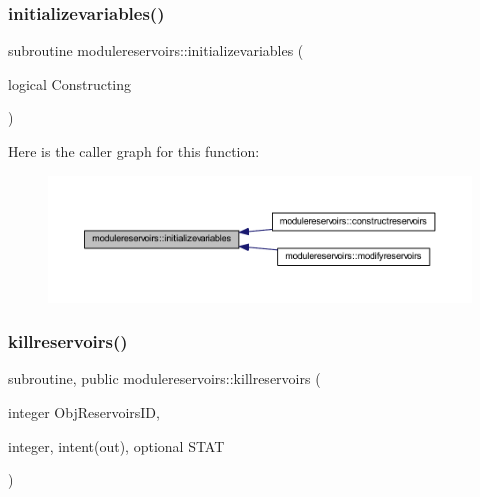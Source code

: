 \subsubsection{\texorpdfstring{initializevariables()}{initializevariables()}}
{\footnotesize\ttfamily subroutine modulereservoirs\+::initializevariables (\begin{DoxyParamCaption}\item[{logical}]{Constructing }\end{DoxyParamCaption})\hspace{0.3cm}{\ttfamily [private]}}

Here is the caller graph for this function\+:\nopagebreak
\begin{figure}[H]
\begin{center}
\leavevmode
\includegraphics[width=350pt]{namespacemodulereservoirs_a1e658ea45a1665c254648477f576c633_icgraph}
\end{center}
\end{figure}
\mbox{\label{namespacemodulereservoirs_a7b14b20d3da20267f728eae98a202e5e}} 
\subsubsection{\texorpdfstring{killreservoirs()}{killreservoirs()}}
{\footnotesize\ttfamily subroutine, public modulereservoirs\+::killreservoirs (\begin{DoxyParamCaption}\item[{integer}]{Obj\+Reservoirs\+ID,  }\item[{integer, intent(out), optional}]{S\+T\+AT }\end{DoxyParamCaption})}

